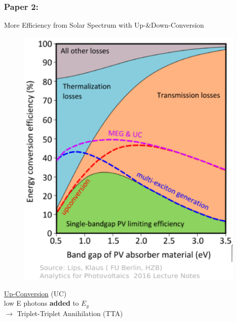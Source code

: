 \documentclass[compress]{beamer}
\begin{document}
\begin{frame}
  \frametitle{Paper 2:}
More Efficiency from Solar Spectrum with Up-\&Down-Conversion\\
\small
\begin{multicols}{2}
\begin{figure}[H]
\includegraphics[width=1\columnwidth]{../img/SF_esq17.pdf}
\end{figure}
\columnbreak

\underline{Up-Conversion} (UC)\\
low E photons \textbf{added} to $E_g$\\
$\rightarrow$ Triplet-Triplet Annihilation (TTA)\\

\vspace{10pt}


\end{multicols}
\end{frame}
\end{document}
